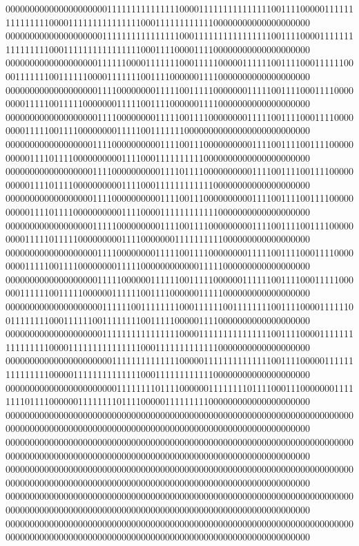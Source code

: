 000000000000000000000111111111111111000011111111111111100111100000111111111111111000011111111111111100011111111111100000000000000000000
000000000000000000001111111111111111000111111111111111100111100001111111111111111000111111111111111100011110000111100000000000000000000
000000000000000000011111100001111111000111110000011111100111100011111100001111111001111110000111111100111100000011110000000000000000000
000000000000000000011110000000011111001111100000001111100111100011110000000011111001111100000001111100111100000011110000000000000000000
000000000000000000011110000000011111001111000000001111100111100011110000000011111001111000000001111100111111100000000000000000000000000
000000000000000000111100000000001111001110000000000111100111100111100000000001111011110000000000111100011111111110000000000000000000000
000000000000000000111100000000001111011110000000000111100111100111100000000001111011110000000000111100011111111111100000000000000000000
000000000000000000111100000000001111001110000000000111100111100111100000000001111011110000000000111100001111111111110000000000000000000
000000000000000000111110000000001111001111000000000111100111100111100000000011111011111000000000111100000001111111111000000000000000000
000000000000000000011110000000011111001111000000001111100111100011110000000011111001111000000001111100000000000011111000000000000000000
000000000000000000011111000000111111001111100000011111100111100011111000000111111001111100000011111100111100000011111000000000000000000
000000000000000000001111110011111111000111111001111111100111100001111110011111111000111111001111111100111110000011110000000000000000000
000000000000000000001111111111111111000011111111111111100111100001111111111111111000011111111111111100011111111111110000000000000000000
000000000000000000000011111111111111000001111111111111100111100000111111111111111000001111111111111100011111111111100000000000000000000
000000000000000000000001111111101111000000111111110111100011100000001111111101111000000111111110111100000111111111000000000000000000000
000000000000000000000000000000000000000000000000000000000000000000000000000000000000000000000000000000000000000000000000000000000000000
000000000000000000000000000000000000000000000000000000000000000000000000000000000000000000000000000000000000000000000000000000000000000
000000000000000000000000000000000000000000000000000000000000000000000000000000000000000000000000000000000000000000000000000000000000000
000000000000000000000000000000000000000000000000000000000000000000000000000000000000000000000000000000000000000000000000000000000000000
000000000000000000000000000000000000000000000000000000000000000000000000000000000000000000000000000000000000000000000000000000000000000
